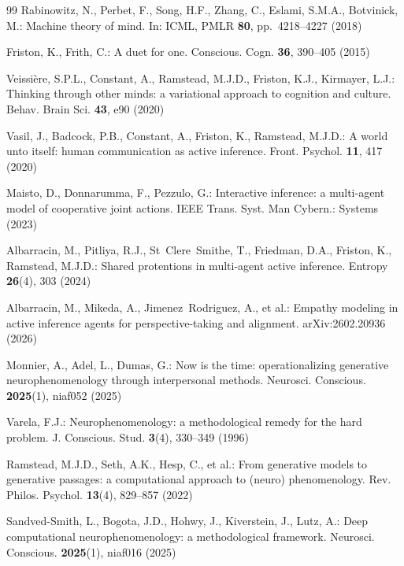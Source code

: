 \documentclass[runningheads]{llncs}
\begin{document}
\begin{thebibliography}{99}
Rabinowitz, N., Perbet, F., Song, H.F., Zhang, C., Eslami, S.M.A., Botvinick, M.: Machine theory of mind. In: ICML, PMLR \textbf{80}, pp.~4218--4227 (2018)

Friston, K., Frith, C.: A duet for one. Conscious. Cogn. \textbf{36}, 390--405 (2015)

Veissi\`{e}re, S.P.L., Constant, A., Ramstead, M.J.D., Friston, K.J., Kirmayer, L.J.: Thinking through other minds: a variational approach to cognition and culture. Behav. Brain Sci. \textbf{43}, e90 (2020)

Vasil, J., Badcock, P.B., Constant, A., Friston, K., Ramstead, M.J.D.: A world unto itself: human communication as active inference. Front. Psychol. \textbf{11}, 417 (2020)

Maisto, D., Donnarumma, F., Pezzulo, G.: Interactive inference: a multi-agent model of cooperative joint actions. IEEE Trans. Syst. Man Cybern.: Systems (2023)

Albarracin, M., Pitliya, R.J., St~Clere~Smithe, T., Friedman, D.A., Friston, K., Ramstead, M.J.D.: Shared protentions in multi-agent active inference. Entropy \textbf{26}(4), 303 (2024)

Albarracin, M., Mikeda, A., Jimenez~Rodriguez, A., et al.: Empathy modeling in active inference agents for perspective-taking and alignment. arXiv:2602.20936 (2026)

Monnier, A., Adel, L., Dumas, G.: Now is the time: operationalizing generative neurophenomenology through interpersonal methods. Neurosci. Conscious. \textbf{2025}(1), niaf052 (2025)

Varela, F.J.: Neurophenomenology: a methodological remedy for the hard problem. J. Conscious. Stud. \textbf{3}(4), 330--349 (1996)

Ramstead, M.J.D., Seth, A.K., Hesp, C., et al.: From generative models to generative passages: a computational approach to (neuro) phenomenology. Rev. Philos. Psychol. \textbf{13}(4), 829--857 (2022)

Sandved-Smith, L., Bogota, J.D., Hohwy, J., Kiverstein, J., Lutz, A.: Deep computational neurophenomenology: a methodological framework. Neurosci. Conscious. \textbf{2025}(1), niaf016 (2025)


\end{thebibliography}
\end{document}
